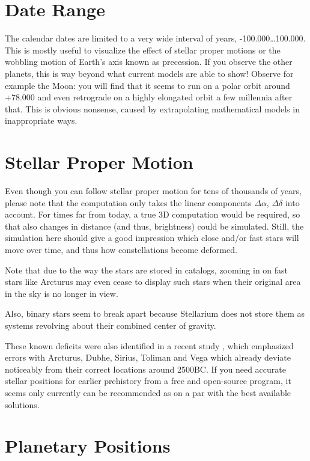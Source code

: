 \section{Date Range}
\label{sec:Accuracy:DateRange}

The calendar dates are limited to a very wide interval of years, -100.000\ldots100.000. 
This is mostly useful to visualize the effect of stellar proper motions or the wobbling 
motion of Earth's axis known as precession. 
If you observe the other planets, this is way beyond what current models are able to show! 
Observe for example the Moon: you will find that it seems to run 
on a polar orbit around +78.000 and even retrograde on a highly elongated orbit a few millennia after that. 
This is obvious nonsense, caused by extrapolating mathematical models in inappropriate ways. 

\section{Stellar Proper Motion}
\label{sec:Accuracy:ProperMotion}

Even though you can follow stellar proper motion for tens of thousands of years, 
please note that the computation only takes the linear components $\Delta\alpha$, $\Delta\delta$ into account. 
For times far from today, a true 3D computation would be required, 
so that also changes in distance (and thus, brightness) could be simulated. 
Still, the simulation here should give a good impression which close and/or fast stars 
will move over time, and thus how constellations become deformed.

Note that due to the way the stars are stored in catalogs, zooming in on fast stars like Arcturus 
may even cease to display such stars when their original area in the sky is no longer in view.

Also, binary stars seem to break apart because Stellarium does not store them as systems 
revolving about their combined center of gravity.

These known deficits were also identified in a recent study
\citep{deLorenzis:2018}, which emphasized errors with Arcturus, Dubhe,
Sirius, Toliman and Vega which already deviate noticeably from their
correct locations around 2500BC.  If you need accurate stellar
positions for earlier prehistory from a free and open-source program,
it seems only  currently can be recommended as
on a par with the best available solutions.


\section{Planetary Positions}
\label{sec:Accuracy:Planets}

